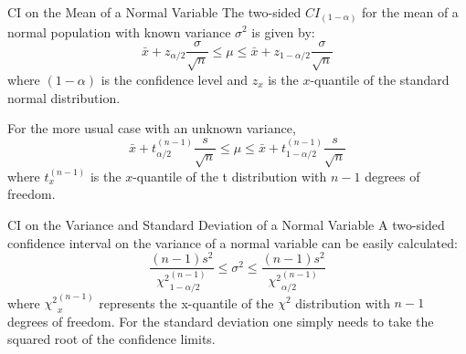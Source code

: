 \begin{frame}{CI on the Mean of a Normal Variable}
The two-sided $CI_{(1-\alpha)}$ for the mean of a normal population with known variance $\sigma^2$ is given by:
\begin{equation*}
\bar{x}+z_{\alpha/2}\frac{\sigma}{\sqrt{n}}\leq\mu\leq\bar{x}+z_{1-\alpha/2}\frac{\sigma}{\sqrt{n}}
\end{equation*}
\noindent where $(1-\alpha)$ is the confidence level and $z_{x}$ is the $x$-quantile of the standard normal distribution.
\bigskip

For the more usual case with an unknown variance,
\begin{equation*}
\bar{x}+t_{\alpha/2}^{(n-1)}\frac{s}{\sqrt{n}}\leq\mu\leq\bar{x}+t_{1-\alpha/2}^{(n-1)}\frac{s}{\sqrt{n}}
\end{equation*}
\noindent where $t_{x}^{(n-1)}$ is the $x$-quantile of the t distribution with $n-1$ degrees of freedom.
\end{frame}


\begin{frame}{CI on the Variance and Standard Deviation of a Normal Variable}
A two-sided confidence interval on the variance of a normal variable can be easily calculated:
\begin{equation*}
\frac{(n-1)s^2}{{\chi^2}_{1 - \alpha/2}^{(n-1)}}\leq\sigma^2\leq\frac{(n-1)s^2}{{\chi^2}_{\alpha/2}^{(n-1)}}
\end{equation*}
\noindent where ${\chi^2}_{x}^{(n-1)}$ represents the x-quantile of the $\chi^2$ distribution with $n-1$ degrees of freedom. For the standard deviation one simply needs to take the squared root of the confidence limits.
\end{frame}


%

